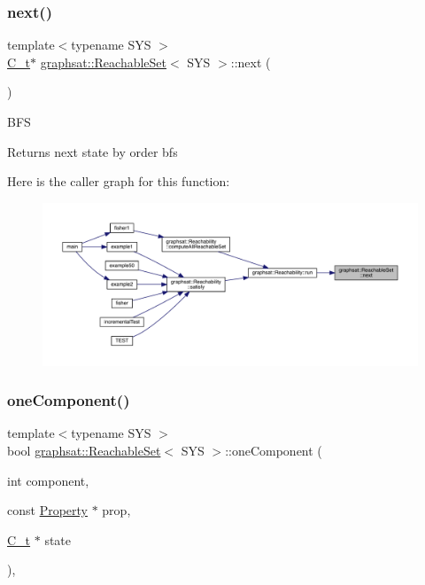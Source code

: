 \subsubsection{\texorpdfstring{next()}{next()}}
{\footnotesize\ttfamily template$<$typename S\+YS $>$ \\
\mbox{\hyperlink{classgraphsat_1_1_reachable_set_a0b7981a216ec4c46be913e08d5f0cd07}{C\+\_\+t}}$\ast$ \mbox{\hyperlink{classgraphsat_1_1_reachable_set}{graphsat\+::\+Reachable\+Set}}$<$ S\+YS $>$\+::next (\begin{DoxyParamCaption}{ }\end{DoxyParamCaption})\hspace{0.3cm}{\ttfamily [inline]}}

B\+FS \begin{DoxyReturn}{Returns}
next state by order bfs 
\end{DoxyReturn}
Here is the caller graph for this function\+:
\nopagebreak
\begin{figure}[H]
\begin{center}
\leavevmode
\includegraphics[width=350pt]{classgraphsat_1_1_reachable_set_a1de529cd581827bc7f43acea384af78b_icgraph}
\end{center}
\end{figure}
\mbox{\label{classgraphsat_1_1_reachable_set_a2fa079a00ee93e99ca6b2aaf1e7a03bd}} 
\subsubsection{\texorpdfstring{oneComponent()}{oneComponent()}}
{\footnotesize\ttfamily template$<$typename S\+YS $>$ \\
bool \mbox{\hyperlink{classgraphsat_1_1_reachable_set}{graphsat\+::\+Reachable\+Set}}$<$ S\+YS $>$\+::one\+Component (\begin{DoxyParamCaption}\item[{int}]{component,  }\item[{const \mbox{\hyperlink{classgraphsat_1_1_property}{Property}} $\ast$}]{prop,  }\item[{\mbox{\hyperlink{classgraphsat_1_1_reachable_set_a0b7981a216ec4c46be913e08d5f0cd07}{C\+\_\+t}} $\ast$}]{state }\end{DoxyParamCaption})\hspace{0.3cm}{\ttfamily [inline]}, {\ttfamily [private]}}


